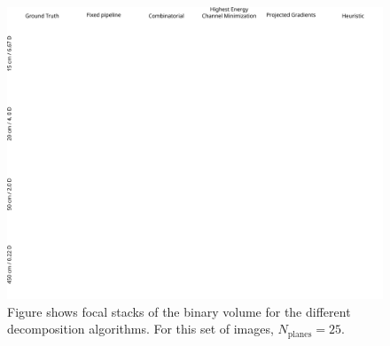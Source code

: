 \begin{figure}[!htb]
\centering
\includegraphics[width=0.99\columnwidth]{images/volumetric/acd_exp9/exp_FS}
\caption[Adaptive color decomposition: focal stack]{Figure shows focal stacks of the binary volume for the different decomposition algorithms. For this set of images, $N_{\text{planes}}=25$.}
\label{fig:volumetric:acd:exp9:focalstack}
\end{figure}

